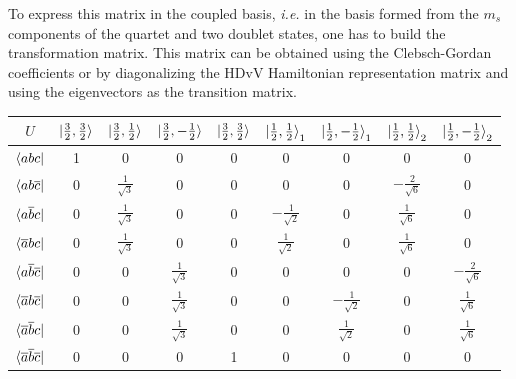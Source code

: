 \documentclass[12pt]{report}
\numberwithin{equation}{section}
\begin{document}

To express this matrix in the coupled basis, \textit{i.e.} in the basis formed from the $m_s$ components of the quartet and two doublet states, one has to build the transformation matrix.
This matrix can be obtained using the Clebsch-Gordan coefficients or by diagonalizing the HDvV Hamiltonian representation matrix and using the eigenvectors as the transition matrix.

\begin{center}
    \begin{tabular}{c | c c c c c c c c}
        $U$ & $\ket{\frac{3}{2},\frac{3}{2}}$ & $\ket{\frac{3}{2},\frac{1}{2}}$ & $\ket{\frac{3}{2},-\frac{1}{2}}$ & $\ket{\frac{3}{2},\frac{3}{2}}$ & $\ket{\frac{1}{2},\frac{1}{2}}_1$ & $\ket{\frac{1}{2},-\frac{1}{2}}_1$ & $\ket{\frac{1}{2},\frac{1}{2}}_2$ & $\ket{\frac{1}{2},-\frac{1}{2}}_2$\\
        \hline
        $\bra{abc}$ &  1 & 0 & 0 & 0 & 0 & 0 & 0 &0  \\
        $\bra{ab\overline{c}}$ &  0 & $\frac{1}{\sqrt{3}}$ & 0 & 0 & 0 &  0& $-\frac{2}{\sqrt{6}}$ &0   \\
        $\bra{a\overline{b}c}$ & 0 &  $\frac{1}{\sqrt{3}}$& 0 & 0 & $-\frac{1}{\sqrt{2}}$ & 0 & $\frac{1}{\sqrt{6}}$ & 0 \\
        $\bra{\overline{a}bc}$ &  0 & $\frac{1}{\sqrt{3}}$ &  0&  0 &  $\frac{1}{\sqrt{2}}$& 0& $\frac{1}{\sqrt{6}}$ & 0  \\
        $\bra{a\overline{b}\overline{c}}$ & 0 & 0 & $\frac{1}{\sqrt{3}}$ &0  & 0 &0 &0 & $-\frac{2}{\sqrt{6}}$  \\
        $\bra{\overline{a}b\overline{c}}$ &  0 & 0 & $\frac{1}{\sqrt{3}}$ & 0 & 0 & $-\frac{1}{\sqrt{2}}$ & 0 & $\frac{1}{\sqrt{6}}$ \\
        $\bra{\overline{a}\overline{b}c}$ &  0  & 0 & $\frac{1}{\sqrt{3}}$ & 0 & 0 & $\frac{1}{\sqrt{2}}$ &0  & $\frac{1}{\sqrt{6}}$ \\
        $\bra{\overline{a}\overline{b}\overline{c}}$ & 0 &0 & 0 & 1 & 0 & 0 & 0 & 0  
    \end{tabular}
\end{center}
\end{document}

